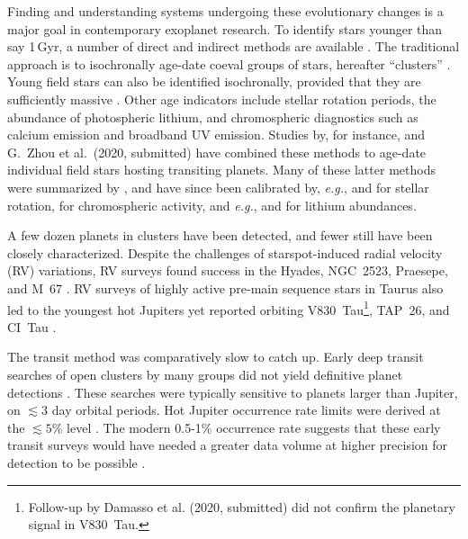 \documentclass[12pt,twocolumn,tighten]{aastex63}
\begin{document}
Finding and understanding systems undergoing these evolutionary changes is
a major goal in contemporary exoplanet research.  To identify stars
younger than say 1$\,$Gyr, a number of direct and indirect methods are
available \citep{soderblom_ages_2010}.  The traditional approach is to
isochronally age-date coeval groups of stars, hereafter ``clusters''
\citep[{\it
e.g.},][]{lada_embedded_2003,zuckerman_young_2004,krumholz_star_2019}.
Young field stars can also be identified isochronally, provided that
they are sufficiently massive \citep{berger_gaia-kepler_2020}.  Other
age indicators include stellar rotation periods, the abundance of
photospheric lithium, and chromospheric diagnostics such as calcium
emission and broadband UV emission.  Studies by, for instance,
\citet{david_discovery_2018} and G{.}~Zhou et al{.}~(2020, submitted)
have combined these methods to age-date individual field stars hosting
transiting planets.  Many of these latter methods were summarized by
\citet{mamajek_improved_2008}, and have since been calibrated by, {\it
e.g.},
\citet{irwin_rotational_2009,barnes_color-period_2015,meibom_spin-down_2015,angus_calibrating_2015}
and \citet{curtis_tess_2019} for stellar rotation,
\citet{zerjal_chromospherically_2017} for chromospheric activity, and
{\it e.g.}, \citet{berger_identifying_2018} and
\citet{zerjal_galah_2019} for lithium abundances.


A few dozen planets in clusters have been detected, and fewer still
have been closely characterized.  Despite the challenges of
starspot-induced radial velocity (RV) variations, RV surveys found
success in the Hyades, NGC~2523, Praesepe, and M~67
\citep{Sato_et_al_2007,lovis_mayor_2007,Quinn_et_al_2012,Malavolta_et_al_2016,brucalassi_search_2017}.
RV surveys of highly active pre-main sequence stars in Taurus also led
to the youngest hot Jupiters yet reported orbiting
V830~Tau\footnote{Follow-up by Damasso et al{.} (2020, submitted) did
not confirm the planetary signal in V830~Tau.}, TAP~26, and CI~Tau
\citep{donati_hj_2016,johns-krull_candidate_2016,yu_hot_2017,biddle_k2_2018,flagg_co_2019}.

The transit method was comparatively slow to catch up.  Early deep
transit searches of open clusters by many groups did not yield
definitive planet detections
\citep{mochejska_planets_2005,mochejska_planets_2006,burke_survey_2006,aigrain_monitor_2007,irwin_monitordata_2007,miller_monitor_2008,pepper_photometric_2008,hartman_MMT_IV_2009}.
These searches were typically sensitive to planets larger than
Jupiter, on $\lesssim 3$ day orbital periods.  Hot Jupiter occurrence
rate limits were derived at the $\lesssim 5\%$ level \citep[{\it
e.g.},][]{burke_survey_2006,hartman_MMT_IV_2009}.  The modern 0.5-1\%
occurrence rate suggests that these early transit surveys would have
needed a greater data volume at higher precision for detection to be
possible
\citep{mayor_harps_2011,wright_frequency_2012,howard_planet_2012,petigura_metallicity_2018}.
\end{document}
